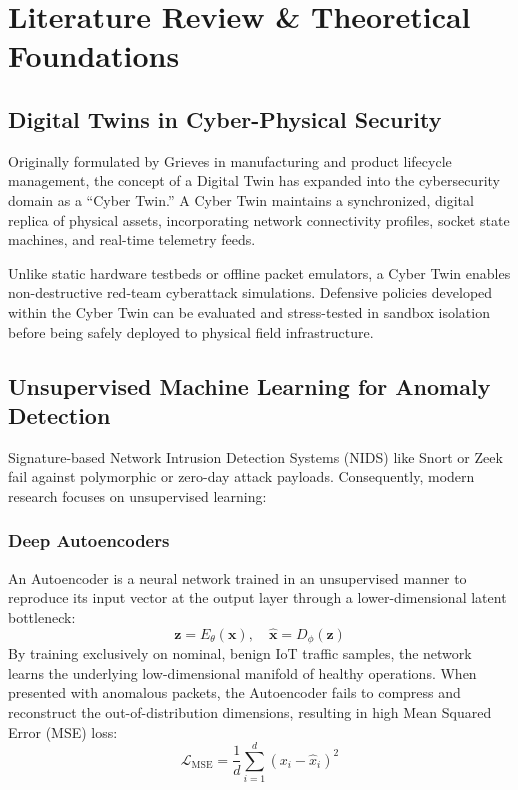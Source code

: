 \documentclass[12pt,a4paper]{report}
\begin{document}
\chapter{Literature Review \& Theoretical Foundations}

\section{Digital Twins in Cyber-Physical Security}
Originally formulated by Grieves in manufacturing and product lifecycle management, the concept of a Digital Twin has expanded into the cybersecurity domain as a ``Cyber Twin.'' A Cyber Twin maintains a synchronized, digital replica of physical assets, incorporating network connectivity profiles, socket state machines, and real-time telemetry feeds. 

Unlike static hardware testbeds or offline packet emulators, a Cyber Twin enables non-destructive red-team cyberattack simulations. Defensive policies developed within the Cyber Twin can be evaluated and stress-tested in sandbox isolation before being safely deployed to physical field infrastructure.

\section{Unsupervised Machine Learning for Anomaly Detection}
Signature-based Network Intrusion Detection Systems (NIDS) like Snort or Zeek fail against polymorphic or zero-day attack payloads. Consequently, modern research focuses on unsupervised learning:

\subsection{Deep Autoencoders}
An Autoencoder is a neural network trained in an unsupervised manner to reproduce its input vector at the output layer through a lower-dimensional latent bottleneck:
\begin{equation}
    \mathbf{z} = E_\theta(\mathbf{x}), \quad \mathbf{\hat{x}} = D_\phi(\mathbf{z})
\end{equation}
By training exclusively on nominal, benign IoT traffic samples, the network learns the underlying low-dimensional manifold of healthy operations. When presented with anomalous packets, the Autoencoder fails to compress and reconstruct the out-of-distribution dimensions, resulting in high Mean Squared Error (MSE) loss:
\begin{equation}
    \mathcal{L}_{\text{MSE}} = \frac{1}{d} \sum_{i=1}^{d} (x_i - \hat{x}_i)^2
\end{equation}
\end{document}
